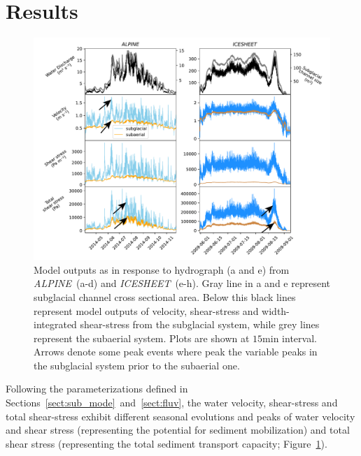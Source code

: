 \documentclass[11pt]{article}
\newcommand{\alpine}{\textit{ALPINE}\,}
\newcommand{\icesheet}{\textit{ICESHEET}\,}
\newcommand{\unit}[1]{$\mathrm{#1}$}
\begin{document}
\section{Results}

\begin{center}
  \begin{figure}[h]
    \includegraphics[width=0.8\linewidth]{Fig2.pdf}
    \caption{Model outputs as in response to hydrograph (a and e) from \alpine{} (a-d) and \icesheet{} (e-h). Gray line in a and e represent subglacial channel cross sectional area. Below this black lines represent model outputs of velocity, shear-stress and width-integrated shear-stress from the subglacial system, while grey lines represent the subaerial system.
      Plots are shown at $15$\unit{min} interval.
    Arrows denote some peak events where peak the variable peaks in the subglacial system prior to the subaerial one.} 
    \label{fig:model_outs}
  \end{figure}
\end{center}

Following the parameterizations defined in Sections~\ref{sect:sub_mode}~and~\ref{sect:fluv}, the water velocity, shear-stress and total shear-stress exhibit different seasonal evolutions and peaks of water velocity and shear stress (representing the potential for sediment mobilization) and total shear stress (representing the total sediment transport capacity; Figure~\ref{fig:model_outs}).
\end{document}
